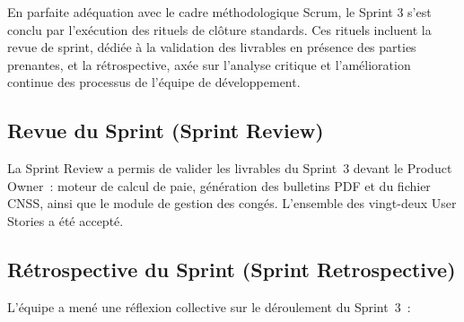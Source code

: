 En parfaite adéquation avec le cadre méthodologique Scrum, le Sprint 3 s'est conclu par l'exécution des rituels de clôture standards. Ces rituels incluent la revue de sprint, dédiée à la validation des livrables en présence des parties prenantes, et la rétrospective, axée sur l'analyse critique et l'amélioration continue des processus de l'équipe de développement.

\subsection{Revue du Sprint (Sprint Review)}

La Sprint Review a permis de valider les livrables du Sprint~3 devant
le Product Owner~: moteur de calcul de paie, génération des bulletins
PDF et du fichier CNSS, ainsi que le module de gestion des congés.
L'ensemble des vingt-deux User Stories a été accepté.

\subsection{Rétrospective du Sprint (Sprint Retrospective)}

L'équipe a mené une réflexion collective sur le déroulement du Sprint~3~:

